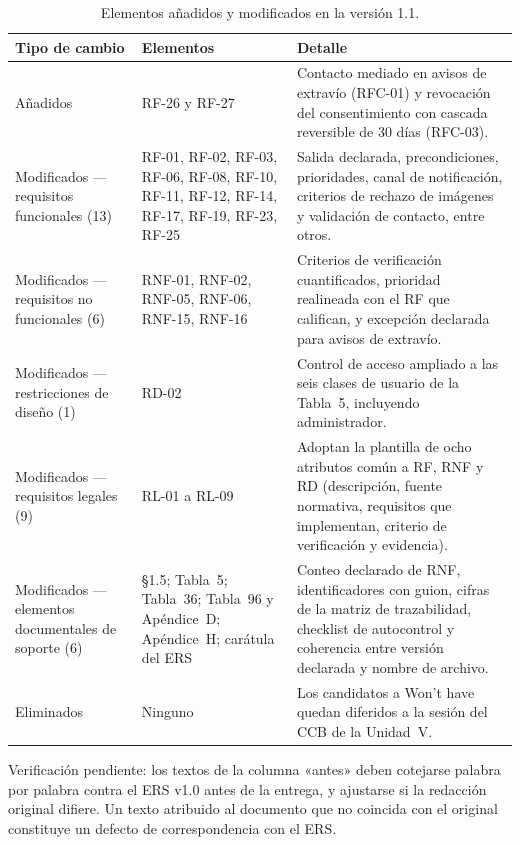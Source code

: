 \documentclass[journal,onecolumn]{IEEEtran}
\begin{document}
	\begin{table}[h!]
		\centering
		\caption{Elementos añadidos y modificados en la versión 1.1.}
		\label{tab:elementos-v3-1}
		\begin{tabular}{
				|>{\raggedright\arraybackslash}p{3.3cm}
				|>{\raggedright\arraybackslash}p{4.5cm}
				|>{\raggedright\arraybackslash}p{5cm}|
			}
			\hline
			\textbf{Tipo de cambio} & \textbf{Elementos} & \textbf{Detalle} \\
			\hline
			Añadidos & RF-26 y RF-27 &
			Contacto mediado en avisos de extravío (RFC-01) y
			revocación del consentimiento con cascada reversible de 30 días
			(RFC-03). \\
			\hline
			Modificados — requisitos funcionales (13) & RF-01, RF-02, RF-03,
			RF-06, RF-08, RF-10, RF-11, RF-12, RF-14, RF-17, RF-19, RF-23,
			RF-25 &
			Salida declarada, precondiciones, prioridades, canal de
			notificación, criterios de rechazo de imágenes y validación de
			contacto, entre otros. \\
			\hline
			Modificados — requisitos no funcionales (6) & RNF-01, RNF-02,
			RNF-05, RNF-06, RNF-15, RNF-16 &
			Criterios de verificación cuantificados, prioridad
			realineada con el RF que califican, y excepción declarada para
			avisos de extravío. \\
			\hline
			Modificados — restricciones de diseño (1) & RD-02 &
			Control de acceso ampliado a las seis clases de usuario
			de la Tabla~5, incluyendo administrador. \\
			\hline
			Modificados — requisitos legales (9) & RL-01 a RL-09 &
			Adoptan la plantilla de ocho atributos común a RF, RNF y
			RD (descripción, fuente normativa, requisitos que implementan,
			criterio de verificación y evidencia). \\
			\hline
			Modificados — elementos documentales de soporte (6) &
			\S1.5; Tabla~5; Tabla~36; Tabla~96 y Apéndice~D; Apéndice~H;
			carátula del ERS &
			Conteo declarado de RNF, identificadores con guion,
			cifras de la matriz de trazabilidad, checklist de autocontrol y
			coherencia entre versión declarada y nombre de archivo. \\
			\hline
			Eliminados & Ninguno &
			Los candidatos a Won't have quedan diferidos a la sesión
			del CCB de la Unidad~V. \\
			\hline
		\end{tabular}
	\end{table}
	
	Verificación pendiente: los textos de la columna «antes» deben
	cotejarse palabra por palabra contra el ERS v1.0 antes de la entrega, y
	ajustarse si la redacción original difiere. Un texto atribuido al documento
	que no coincida con el original constituye un defecto de correspondencia
	con el ERS.
	
\end{document}
